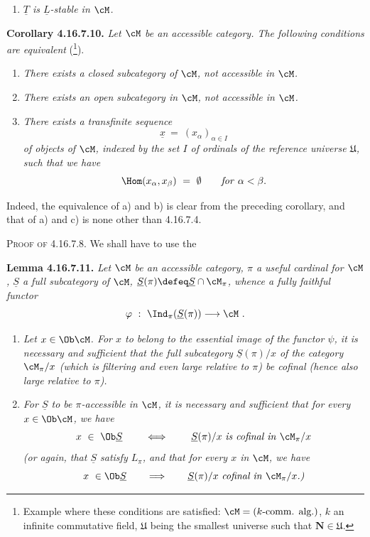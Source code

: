 
\begin{enumerate}
\item[\textit{b$'$)}] \textit{$\underline{T}$ is $\underline{L}$-stable in $\cM$.}
\end{enumerate}

\noindent\textbf{Corollary 4.16.7.10.} \textit{Let $\cM$ be an accessible category. The following conditions are equivalent} (\footnote[202]{Example where these conditions are satisfied: $\cM = (k\text{-comm. alg.})$, $k$ an infinite commutative field, $\mathfrak{U}$ being the smallest universe such that $\mathbf{N}\in\mathfrak{U}$.}).
\begin{enumerate}
\item[\textit{a)}] \textit{There exists a closed subcategory of $\cM$, not accessible in $\cM$.}
\item[\textit{b)}] \textit{There exists an open subcategory in $\cM$, not accessible in $\cM$.}
\item[\textit{c)}] \textit{There exists a transfinite sequence}
\[
\underline{x} \ = \ (x_\alpha)_{\alpha\in I}
\]
\textit{of objects of $\cM$, indexed by the set $I$ of ordinals of the reference universe $\mathfrak{U}$, such that we have}
\[
\Hom(x_\alpha,x_\beta) \ = \ \emptyset \qquad \text{\textit{for} } \alpha<\beta .
\]
\end{enumerate}

\noindent Indeed, the equivalence of a) and b) is clear from the preceding corollary, and that of a) and c) is none other than 4.16.7.4.

\noindent\textsc{Proof of} 4.16.7.8. We shall have to use the

\noindent\textbf{Lemma 4.16.7.11.} \textit{Let $\cM$ be an accessible category, $\pi$ a useful cardinal for $\cM$, $\underline{S}$ a full subcategory of $\cM$, $\underline{S}(\pi)\defeq\underline{S}\cap\cM_\pi$, whence a fully faithful functor}
\[
\varphi \ : \ \Ind_\pi(\underline{S}(\pi)) \longrightarrow \cM \ .
\]

\begin{enumerate}
\item[\textit{a)}] \textit{Let $x\in\Ob\cM$. For $x$ to belong to the essential image of the functor $\psi$, it is necessary and sufficient that the full subcategory $\underline{S}(\pi)/x$ of the category $\cM_\pi/x$ (which is filtering and even large relative to $\pi$) be cofinal (hence also large relative to $\pi$).} %
\item[\textit{b)}] \textit{For $\underline{S}$ to be $\pi$-accessible in $\cM$, it is necessary and sufficient that for every $x\in\Ob\cM$, we have}
\[
x \ \in \ \Ob\underline{S} \qquad\iff\qquad \underline{S}(\pi)/x \text{ \textit{is cofinal in} } \cM_\pi/x
\]
\textit{(or again, that $\underline{S}$ satisfy $L_\pi$, and that for every $x$ in $\cM$, we have}
\[
x \ \in\Ob\underline{S} \qquad\Longrightarrow\qquad \underline{S}(\pi)/x \text{ \textit{cofinal in} } \cM_\pi/x\text{\textit{.)}}
\]
\end{enumerate}

